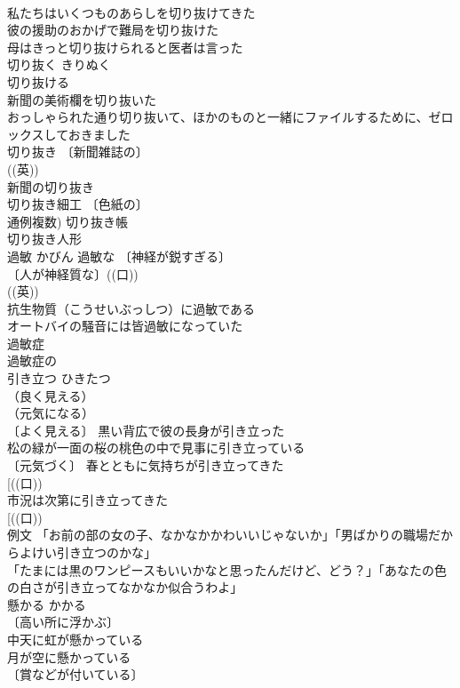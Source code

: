 \documentclass[8pt]{extreport}
\begin{document}
\begin{CJK}{UTF8}{min}
\\	私たちはいくつものあらしを切り抜けてきた 
\\	彼の援助のおかげで難局を切り抜けた 
\\	母はきっと切り抜けられると医者は言った 
\\	切り抜く	きりぬく	
\\	切り抜ける 
\\	新聞の美術欄を切り抜いた 
\\	おっしゃられた通り切り抜いて、ほかのものと一緒にファイルするために、ゼロックスしておきました 
\\	切り抜き 〔新聞雑誌の〕
\\	((英)) 
\\	新聞の切り抜き 
\\	切り抜き細工 〔色紙の〕
\\	通例複数) 切り抜き帳 
\\	切り抜き人形 
\\	過敏	かびん	過敏な 〔神経が鋭すぎる〕
\\	〔人が神経質な〕((口)) 
\\	((英)) 
\\	抗生物質（こうせいぶっしつ）に過敏である 
\\	オートバイの騒音には皆過敏になっていた 
\\	過敏症 
\\	過敏症の 
\\	引き立つ	ひきたつ	
\\	（良く見える）
\\	（元気になる）
\\	〔よく見える〕 黒い背広で彼の長身が引き立った 
\\	松の緑が一面の桜の桃色の中で見事に引き立っている 
\\	〔元気づく〕 春とともに気持ちが引き立ってきた 
\\	[((口))
\\	市況は次第に引き立ってきた 
\\	[((口))
\\	例文 「お前の部の女の子、なかなかかわいいじゃないか」「男ばかりの職場だからよけい引き立つのかな」 
\\	「たまには黒のワンピースもいいかなと思ったんだけど、どう？」「あなたの色の白さが引き立ってなかなか似合うわよ」 
\\	懸かる	かかる	
\\	〔高い所に浮かぶ〕
\\	中天に虹が懸かっている 
\\	月が空に懸かっている 
\\	〔賞などが付いている〕

\end{CJK}
\end{document}
